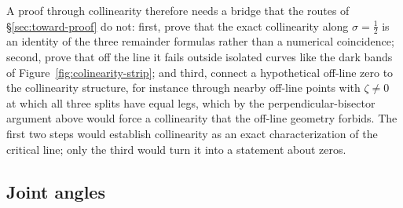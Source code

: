 \documentclass[11pt]{article}
\theoremstyle{definition}
\begin{document}
A proof through collinearity therefore needs a bridge that the routes of
\S\ref{sec:toward-proof} do not: first, prove that the exact collinearity
along $\sigma=\tfrac12$ is an
identity of the three remainder formulas rather than a numerical
coincidence; second, prove that off the line it fails outside isolated
curves like the dark bands of Figure~\ref{fig:colinearity-strip}; and third,
connect a hypothetical off-line zero to the collinearity structure, for
instance through nearby off-line points with $\zeta\neq0$ at which all three
splits have equal legs, which by the perpendicular-bisector argument above
would force a collinearity that the off-line geometry forbids. The first
two steps would establish collinearity as an exact characterization of the
critical line; only the third would turn it into a statement about zeros.

\subsection{Joint angles}\label{sec:joint-angles}
\end{document}
